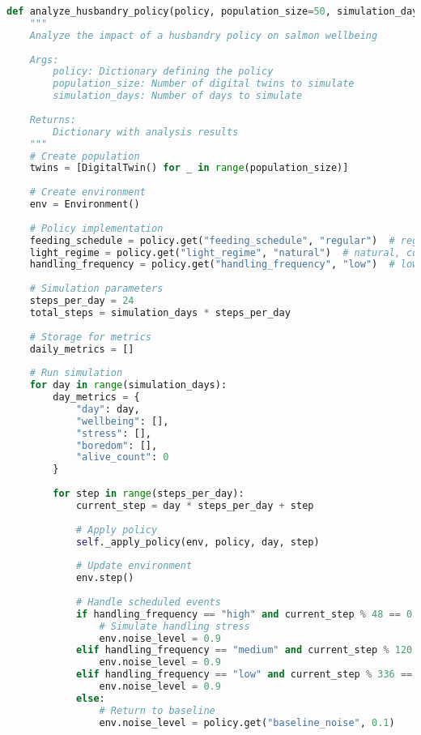 \documentclass[11pt,a4paper]{article}
\begin{document}
\begin{lstlisting}[language=Python]
def analyze_husbandry_policy(policy, population_size=50, simulation_days=60):
    """
    Analyze the impact of a husbandry policy on salmon wellbeing
    
    Args:
        policy: Dictionary defining the policy
        population_size: Number of digital twins to simulate
        simulation_days: Number of days to simulate
        
    Returns:
        Dictionary with analysis results
    """
    # Create population
    twins = [DigitalTwin() for _ in range(population_size)]
    
    # Create environment
    env = Environment()
    
    # Policy implementation
    feeding_schedule = policy.get("feeding_schedule", "regular")  # regular, variable
    light_regime = policy.get("light_regime", "natural")  # natural, constant, gradual
    handling_frequency = policy.get("handling_frequency", "low")  # low, medium, high
    
    # Simulation parameters
    steps_per_day = 24
    total_steps = simulation_days * steps_per_day
    
    # Storage for metrics
    daily_metrics = []
    
    # Run simulation
    for day in range(simulation_days):
        day_metrics = {
            "day": day,
            "wellbeing": [],
            "stress": [],
            "boredom": [],
            "alive_count": 0
        }
        
        for step in range(steps_per_day):
            current_step = day * steps_per_day + step
            
            # Apply policy
            self._apply_policy(env, policy, day, step)
            
            # Update environment
            env.step()
            
            # Handle scheduled events
            if handling_frequency == "high" and current_step % 48 == 0:
                # Simulate handling stress
                env.noise_level = 0.9
            elif handling_frequency == "medium" and current_step % 120 == 0:
                env.noise_level = 0.9
            elif handling_frequency == "low" and current_step % 336 == 0:
                env.noise_level = 0.9
            else:
                # Return to baseline
                env.noise_level = policy.get("baseline_noise", 0.1)
                

\end{lstlisting}
\end{document}
